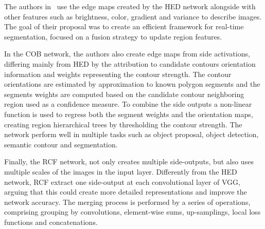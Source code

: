 The authors in~\cite{cheng2016} use the edge maps created by the HED network alongside with other features such as brightness, color, gradient and variance to describe images. The goal of their proposal was to create an efficient framework for real-time segmentation, focused on a fusion strategy to update region features.


In the COB network, the authors also create edge maps from side activations, differing mainly from HED by the attribution to candidate contours orientation information and weights representing the contour strength. The contour orientations are estimated by approximation to known polygon segments and the segments weights are computed based on the candidate contour neighboring region used as a confidence measure. To combine the side outputs a non-linear function is used to regress both the segment weights and the orientation maps, creating region hierarchical trees by thresholding the contour strength. The network perform well in multiple tasks such as object proposal, object detection, semantic contour and segmentation.


Finally, the RCF network, not only creates multiple side-outputs, but also uses multiple scales of the images in the input layer. Differently from the HED network, RCF extract one side-output at each convolutional layer of VGG, arguing that  this could create more detailed representations and improve the network accuracy. The merging process is performed by a series of operations, comprising grouping by convolutions, element-wise sums, up-samplings, local loss functions and concatenations.  






